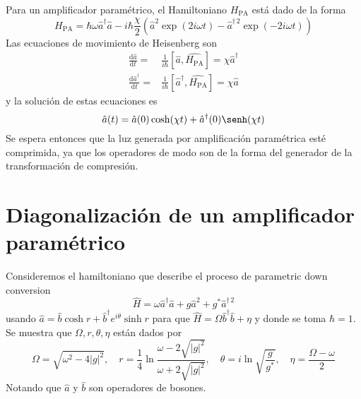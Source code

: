 Para un amplificador paramétrico, el Hamiltoniano $H_{\text{PA}}$ está dado de la forma
\begin{equation}
  H_{\text{PA}} = \hbar\omega \hat{a}^{\dagger} \hat{a} - i\hbar \frac{\chi}{2}(\hat{a}^2 \exp(2i\omega t) - \hat{a}^{\dagger\,2}\exp(-2i\omega t))
\end{equation}
Las ecuaciones de movimiento de Heisenberg son
\begin{align}
  \frac{\text{d}\hat{a}}{\text{d}t} =           & \frac{1}{i\hbar}[\hat{a}, \hat{H_{\text{PA}}}] = \chi \hat{a}^\dagger   \\
  \frac{\text{d}\hat{a}^{\dagger}}{\text{d}t} = & \frac{1}{i\hbar}[\hat{a}^{\dagger}, \hat{H_{\text{PA}}}] = \chi \hat{a}
\end{align}
y la solución de estas ecuaciones es
\begin{equation}
  \hat{a}(t) = \hat{a}(0) \cosh(\chi t) + \hat{a}^\dagger(0) \senh(\chi t)
\end{equation}
Se espera entonces que la luz generada por amplificación paramétrica esté comprimida, ya que los operadores de modo son de la forma del generador de la transformación de compresión.

\section{Diagonalización de un amplificador paramétrico}
Consideremos el hamiltoniano que describe el proceso de parametric down conversion
\begin{equation*}
  \hat{H} = \omega \hat{a}^{\dagger}\hat{a}  + g \hat{a}^{2} + g^{*} \hat{a}^{\dagger\,2}
\end{equation*}
usando $\hat{a} = \hat{b} \cosh{r} + \hat{b}^{\dagger} e^{i\theta} \sinh{r}$ para que $\hat{H} = \Omega \hat{b}^{\dagger}\hat{b} + \eta$ y donde se toma $\hbar = 1$. Se muestra que $\Omega, r,\theta, \eta$ están dados por
\begin{equation*}
  \Omega = \sqrt{\omega^2 - 4|g|^2}, \quad r=\frac{1}{4}\ln{\frac{\omega - 2\sqrt{|g|^2}}{\omega + 2\sqrt{|g|^2}}}, \quad \theta = i\ln{\sqrt{\frac{g}{g^{*}}}}, \quad \eta = \frac{\Omega - \omega}{2}
\end{equation*}
Notando que $\hat{a}$ y $\hat{b}$ son operadores de bosones.

